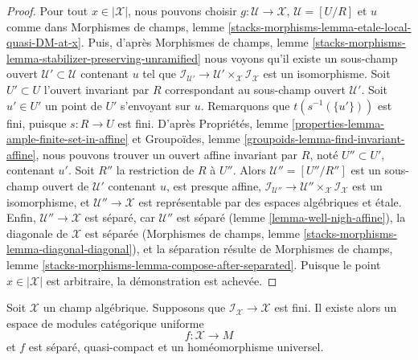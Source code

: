 \begin{proof}
Pour tout $x \in |\mathcal{X}|$, nous pouvons choisir
$g : \mathcal{U} \to \mathcal{X}$, $\mathcal{U} = [U/R]$ et $u$ comme dans
Morphismes de champs,
lemme \ref{stacks-morphisms-lemma-etale-local-quasi-DM-at-x}.
Puis, d'après
Morphismes de champs, lemme
\ref{stacks-morphisms-lemma-stabilizer-preserving-unramified}
nous voyons qu'il existe un sous-champ ouvert
$\mathcal{U}' \subset \mathcal{U}$ contenant $u$
tel que $\mathcal{I}_{\mathcal{U}'} \to
\mathcal{U}' \times_\mathcal{X} \mathcal{I}_\mathcal{X}$
est un isomorphisme.
Soit $U' \subset U$ l'ouvert invariant par $R$ correspondant au
sous-champ ouvert $\mathcal{U}'$.
Soit $u' \in U'$ un point de $U'$ s'envoyant sur $u$.
Remarquons que $t(s^{-1}(\{u'\}))$ est fini, puisque $s : R \to U$ est fini.
D'après Propriétés, lemme \ref{properties-lemma-ample-finite-set-in-affine}
et Groupoïdes, lemme \ref{groupoids-lemma-find-invariant-affine},
nous pouvons trouver un ouvert affine invariant par $R$, noté $U'' \subset U'$,
contenant $u'$. Soit $R''$ la restriction de $R$ à $U''$.
Alors $\mathcal{U}'' = [U''/R'']$ est un sous-champ ouvert de
$\mathcal{U}'$ contenant $u$, est presque affine,
$\mathcal{I}_{\mathcal{U}''} \to
\mathcal{U}'' \times_\mathcal{X} \mathcal{I}_\mathcal{X}$
est un isomorphisme, et $\mathcal{U}'' \to \mathcal{X}$
est représentable par des espaces algébriques et \'etale.
Enfin, $\mathcal{U}'' \to \mathcal{X}$ est séparé, car
$\mathcal{U}''$ est séparé (lemme \ref{lemma-well-nigh-affine}),
la diagonale de $\mathcal{X}$ est séparée
(Morphismes de champs, lemme \ref{stacks-morphisms-lemma-diagonal-diagonal}),
et la séparation résulte de Morphismes de champs, lemme
\ref{stacks-morphisms-lemma-compose-after-separated}.
Puisque le point $x \in |\mathcal{X}|$ est arbitraire, la démonstration est achevée.
\end{proof}

\begin{theorem}
\label{theorem-keel-mori}
Soit $\mathcal{X}$ un champ algébrique. Supposons que
$\mathcal{I}_\mathcal{X} \to \mathcal{X}$ est fini.
Il existe alors un espace de modules catégorique uniforme
$$
f : \mathcal{X} \longrightarrow M
$$
et $f$ est séparé, quasi-compact et un homéomorphisme universel.
\end{theorem}

